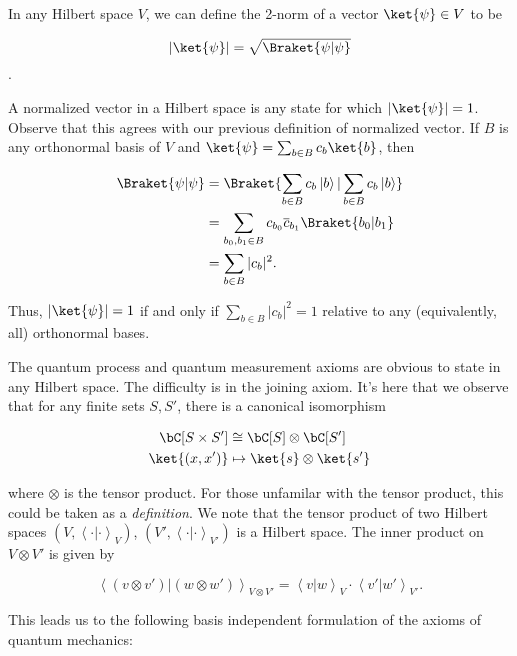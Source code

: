 In any Hilbert space $V$, we can define the 2-norm of a vector $\ket{\psi}\in V$ to be

$$|\ket{\psi}|=\sqrt{\Braket{\psi | \psi}}$$.

A normalized vector in a Hilbert space is any state for which $|\ket{\psi}|=1$. Observe that this agrees with our previous definition of normalized vector. If $B$ is any orthonormal basis of $V$ and $\ket{\psi}=\sum_{b\in B}c_b \ket{b}$, then

\begin{align*}
\Braket{\psi|\psi}&=\Braket{\sum_{b\in B}c_b\left|b\right>|\sum_{b\in B}c_b \left|b\right>}\\
&=\sum_{b_0,b_1\in B}c_{b_0}\overline{c}_{b_1}\Braket{b_0 | b_1}\\
&=\sum_{b\in B} |c_b|^2.
\end{align*}

Thus, $|\ket{\psi}|=1$ if and only if $\sum_{b\in B} |c_b|^2=1$ relative to any (equivalently, all) orthonormal bases.

The quantum process and quantum measurement axioms are obvious to state in any Hilbert space. The difficulty is in the joining axiom. It's here that we observe that for any finite sets $S,S'$, there is a canonical isomorphism

\begin{align*}
\bC[S\times S']&\cong \bC[S]\otimes \bC[S']\\
\ket{(x,x')}&\mapsto \ket{s}\otimes \ket{s'}
\end{align*}

where $\otimes$ is the tensor product. For those unfamilar with the tensor product, this could be taken as a {\em definition}. We note that the tensor product of two Hilbert spaces $(V,\left<\cdot|\cdot\right>_V)$, $(V',\left<\cdot|\cdot\right>_{V'})$ is a Hilbert space. The inner product on $V\otimes V'$ is given by

$$\left<(v\otimes v')| (w\otimes w')\right>_{V\otimes V'}=\left<v | w\right>_V\cdot \left<v' | w'\right>_{V'}.$$

This leads us to the following basis independent formulation of the axioms of quantum mechanics:


